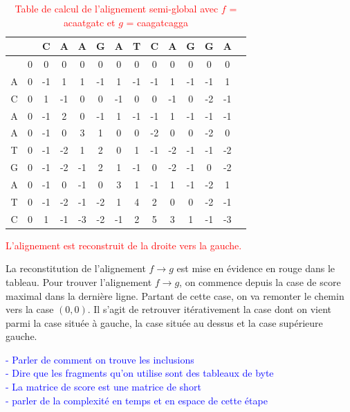 \documentclass{article}
\begin{document}
\begin{table}[h]
	\centering
	\begin{tabular}{|c|c|c|c|c|c|c|c|c|c|c|c|c|c|}
		\hline
		&& C & A & A & G & A & T & C & A & G & G & A\\		
		\hline
		& 0 & 0 & 0 & 0 & 0 & 0 & 0 & 0 & 0 & 0 & \cellcolor{lightgreen}0 & 0  \\
		\hline 
		A&\cellcolor{lightred}0 & -1 & 1 & 1 & -1 & 1 & -1 & -1 & 1 & -1 & -1 &\cellcolor{lightgreen}1 \\
		\hline 
		C&0 & \cellcolor{lightred}1 & -1 & 0 & 0 & -1 & 0 & 0 & -1 & 0 & -2 & -1 \\
		\hline 
		A&0 & -1 & \cellcolor{lightred}2 & 0 & -1 & 1 & -1 & -1 & 1 & -1 & -1 & -1  \\
		\hline 
		A&0 & -1 & 0 & \cellcolor{lightred}3 & 1 & 0 & 0 & -2 & 0 & 0 & -2 & 0 \\
		\hline 
		T&0 & -1 & -2 & \cellcolor{lightred}1 & 2 & 0 & 1 & -1 & -2 & -1 & -1 & -2  \\
		\hline 
		G&0 & -1 & -2 & -1 & \cellcolor{lightred}2 & 1 & -1 & 0 & -2 & -1 & 0 & -2  \\
		\hline 
		A&0 & -1 & 0 & -1 & 0 & \cellcolor{lightred}3 & 1 & -1 & 1 & -1 & -2 & 1  \\
		\hline 
		T&0 & -1 & -2 & -1 & -2 & 1 & \cellcolor{lightred}4 & 2 & 0 & 0 & -2 & -1  \\
		\hline 
		C&0 & 1 & -1 & -3 & -2 & -1 & 2 & \cellcolor{lightred}5 & 3 & 1 & -1 & -3  \\
		\hline 
	\end{tabular}	
	\caption{\textcolor{red}{Table de calcul de l'alignement semi-global avec $f$ = acaatgatc et $g$ = caagatcagga}}
\end{table}

\textcolor{red}{L'alignement est reconstruit de la droite vers la gauche.}

La reconstitution de l'alignement $f \to g$ est mise en évidence en rouge dans le tableau. Pour trouver l'alignement $f \to g$, on  commence depuis la case de score maximal dans la dernière ligne. 
Partant de cette case, on va remonter le chemin vers la case $(0,0)$. Il s'agit de retrouver itérativement la case dont on vient parmi la case située à gauche, la case située au dessus et la case supérieure gauche.

\textcolor{blue}{
- Parler de comment on trouve les inclusions\\
- Dire que les fragments qu'on utilise sont des tableaux de byte\\
- La matrice de score est une matrice de short\\
- parler de la complexité en temps et en espace de cette étape
}
\end{document}
